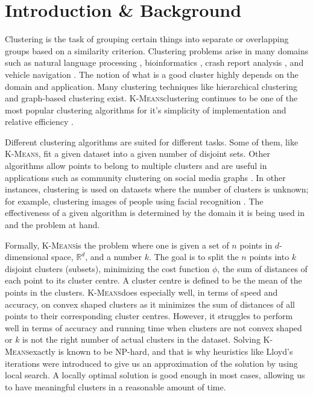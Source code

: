 \documentclass[12pt]{dalthesis}
\newcommand*{\kmeansn}{\textsc{K-Means}} %
\newcommand*{\kmeans}{\kmeansn } %
\begin{document}
\mainmatter

\chapter{Introduction \& Background}
Clustering is the task of grouping certain things into separate or overlapping groups based on a similarity criterion. Clustering problems arise in many domains such as
natural language processing \citep{ravichandran2005randomized},
bioinformatics \citep{edgar2010search}, 
crash report analysis \citep{soto2016machine},
and vehicle navigation \citep{maio1996dynamic}. 
The notion of what is a good cluster highly depends on the domain and application. Many clustering techniques like hierarchical clustering \citep{corpet1988multiple}
and graph-based clustering \citep{schaeffer2007graph}
exist. \kmeans clustering continues to be one of the most popular clustering algorithms for it's simplicity of implementation and relative efficiency \citep{jain2010data}.

Different clustering algorithms are suited for different tasks. Some of them, like \kmeansn, fit a given dataset into a given number of disjoint sets. Other algorithms allow points to belong to multiple clusters and are useful in applications such as community clustering on social media graphs \citep{epasto2017ego}. In other instances, clustering is used on datasets where the number of clusters is unknown; for example, clustering images of people using facial recognition \citep{schroff2015facenet}. The effectiveness of a given algorithm is determined by the domain it is being used in and the problem at hand.

Formally, \kmeans is the problem where one is given a set of $n$ points in $d$-dimensional space, $\mathbb{R}^d$, and a number $k$. The goal is to split the $n$ points into $k$ disjoint clusters (subsets), minimizing the cost function $\phi$, the sum of distances of each point to its cluster centre. A cluster centre is defined to be the mean of the points in the clusters. \kmeans does especially well, in terms of speed and accuracy, on convex shaped clusters as it minimizes the sum of distances of all points to their corresponding cluster centres. However, it struggles to perform well in terms of accuracy and running time when clusters are not convex shaped or $k$ is not the right number of actual clusters in the dataset. Solving \kmeans exactly is known to be NP-hard, and that is why heuristics like Lloyd's \citep{1056489} iterations were introduced to give us an approximation of the solution by using local search. A locally optimal solution is good enough in most cases, allowing us to have meaningful clusters in a reasonable amount of time.
\end{document}
